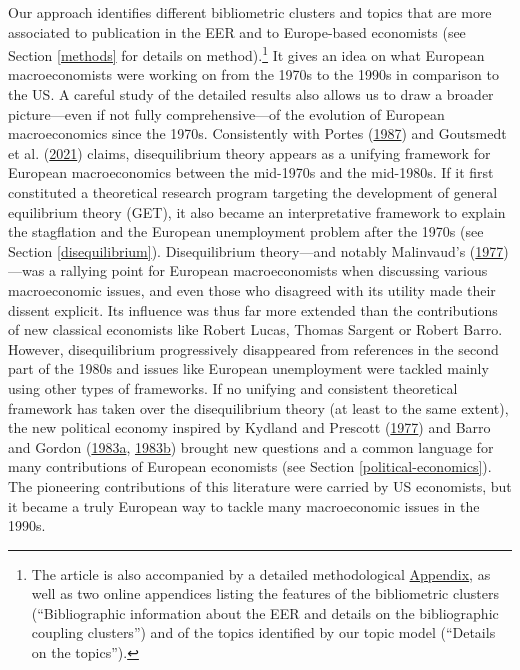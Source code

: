 \documentclass[
]{article}
\begin{document}
Our approach identifies different bibliometric clusters and topics that
are more associated to publication in the EER and to Europe-based
economists (see Section \ref{methods} for details on method).\footnote{The
  article is also accompanied by a detailed methodological
  \protect\hyperlink{appendix}{Appendix}, as well as two online
  appendices listing the features of the bibliometric clusters
  (``Bibliographic information about the EER and details on the
  bibliographic coupling clusters'') and of the topics identified by our
  topic model (``Details on the topics'').} It gives an idea on what
European macroeconomists were working on from the 1970s to the 1990s in
comparison to the US. A careful study of the detailed results also
allows us to draw a broader picture---even if not fully
comprehensive---of the evolution of European macroeconomics since the
1970s. Consistently with Portes
(\protect\hyperlink{ref-portes1987}{1987}) and Goutsmedt et al.
(\protect\hyperlink{ref-goutsmedt2021}{2021}) claims, disequilibrium
theory appears as a unifying framework for European macroeconomics
between the mid-1970s and the mid-1980s. If it first constituted a
theoretical research program targeting the development of general
equilibrium theory (GET), it also became an interpretative framework to
explain the stagflation and the European unemployment problem after the
1970s (see Section \ref{disequilibrium}). Disequilibrium theory---and
notably Malinvaud's (\protect\hyperlink{ref-malinvaud1977}{1977})---was
a rallying point for European macroeconomists when discussing various
macroeconomic issues, and even those who disagreed with its utility made
their dissent explicit. Its influence was thus far more extended than
the contributions of new classical economists like Robert Lucas, Thomas
Sargent or Robert Barro. However, disequilibrium progressively
disappeared from references in the second part of the 1980s and issues
like European unemployment were tackled mainly using other types of
frameworks. If no unifying and consistent theoretical framework has
taken over the disequilibrium theory (at least to the same extent), the
new political economy inspired by Kydland and Prescott
(\protect\hyperlink{ref-kydland1977}{1977}) and Barro and Gordon
(\protect\hyperlink{ref-barro1983}{1983a},
\protect\hyperlink{ref-barro1983c}{1983b}) brought new questions and a
common language for many contributions of European economists (see
Section \ref{political-economics}). The pioneering contributions of this
literature were carried by US economists, but it became a truly European
way to tackle many macroeconomic issues in the 1990s.
\end{document}
